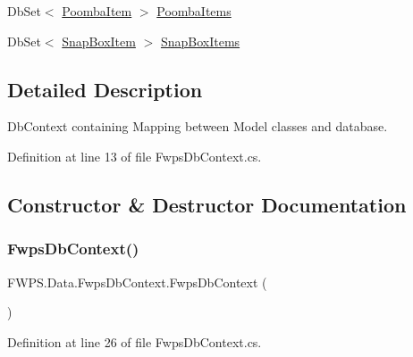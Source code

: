 \begin{DoxyCompactItemize}
\item 
Db\+Set$<$ \mbox{\hyperlink{class_f_w_p_s_1_1_models_1_1_poomba_item}{Poomba\+Item}} $>$ \mbox{\hyperlink{class_f_w_p_s_1_1_data_1_1_fwps_db_context_a9d0b3a9a32a23e33eb99b48f12d70247}{Poomba\+Items}}
\item 
Db\+Set$<$ \mbox{\hyperlink{class_f_w_p_s_1_1_models_1_1_snap_box_item}{Snap\+Box\+Item}} $>$ \mbox{\hyperlink{class_f_w_p_s_1_1_data_1_1_fwps_db_context_ae50f6a05730dfab2c332201cb5be2324}{Snap\+Box\+Items}}
\end{DoxyCompactItemize}


\subsection{Detailed Description}
Db\+Context containing Mapping between Model classes and database. 

Definition at line 13 of file Fwps\+Db\+Context.\+cs.



\subsection{Constructor \& Destructor Documentation}
\mbox{\label{class_f_w_p_s_1_1_data_1_1_fwps_db_context_a1add08e0df79e8bfd3c4ca582159cb11}} 
\subsubsection{\texorpdfstring{Fwps\+Db\+Context()}{FwpsDbContext()}\hspace{0.1cm}{\footnotesize\ttfamily [1/2]}}
{\footnotesize\ttfamily F\+W\+P\+S.\+Data.\+Fwps\+Db\+Context.\+Fwps\+Db\+Context (\begin{DoxyParamCaption}{ }\end{DoxyParamCaption})}



Definition at line 26 of file Fwps\+Db\+Context.\+cs.

